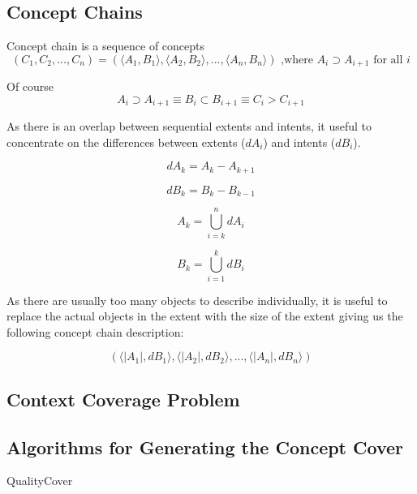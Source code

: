 \documentclass[acmconf,authordraft]{acmart}
\begin{document}
\subsection{Concept Chains}

Concept chain is a sequence of concepts
\begin{equation}
  (C_1, C_2,..., C_n) = (\langle A_1, B_1 \rangle,\langle A_2,B_2 \rangle,  ..., \langle A_n,B_n \rangle)  \text{ ,where  }  A_i \supset  A_{i+1} \text{ for all } i
\end{equation}

Of course
\begin{displaymath}
A_i \supset A_{i+1} \equiv B_i \subset B_{i+1} \equiv C_i > C_{i+1}
\end{displaymath}

As there is an overlap between sequential extents and intents, it useful to concentrate on the differences between extents ($dA_i$) and intents ($dB_i$).

\begin{equation}
dA_k = A_k - A_{k+1}
\end{equation}

\begin{equation}
dB_k = B_k - B_{k-1}
\end{equation}

\begin{equation}
A_k = \bigcup_{i=k}^{n} dA_i
\end{equation}

\begin{equation}
B_k = \bigcup_{i=1}^{k} dB_i
\end{equation}

As there are usually too many objects to describe  individually, it is useful to replace the actual objects in the extent with the size of the extent giving us the following concept chain description:

\begin{displaymath}
 (\langle |A_1|, dB_1 \rangle,\langle |A_2|, dB_2 \rangle,  ..., \langle |A_n|, dB_n \rangle)
\end{displaymath}

\subsection{Context Coverage Problem}
\subsection{Algorithms for Generating the Concept Cover}
QualityCover
\end{document}

